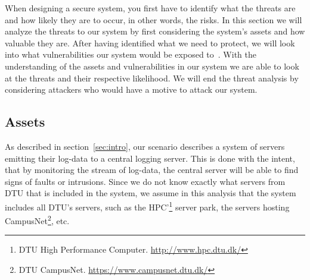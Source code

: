 
When designing a secure system, you first have to identify what the
threats are and how likely they are to occur, in other words, the
risks. In this section we will analyze the threats to our system by
first considering the system's assets and how valuable they are. After
having identified what we need to protect, we will look into what
vulnerabilities our system would be exposed
to~\cite[p. 528]{pfleeger}. With the understanding of the assets and
vulnerabilities in our system we are able to look at the threats and
their respective likelihood. We will end the threat analysis by
considering attackers who would have a motive to attack our system.

\subsection{Assets}
As described in section~\ref{sec:intro}, our scenario describes a
system of servers emitting their log-data to a central logging
server. This is done with the intent, that by monitoring the stream of
log-data, the central server will be able to find signs of faults or
intrusions. Since we do not know exactly what servers from DTU that is
included in the system, we assume in this analysis that the system
includes all DTU's servers, such as the HPC'\footnote{DTU High
  Performance Computer. \url{http://www.hpc.dtu.dk/}} server park, the
servers hosting CampusNet\footnote{DTU
  CampusNet. \url{https://www.campusnet.dtu.dk/}}, etc.

